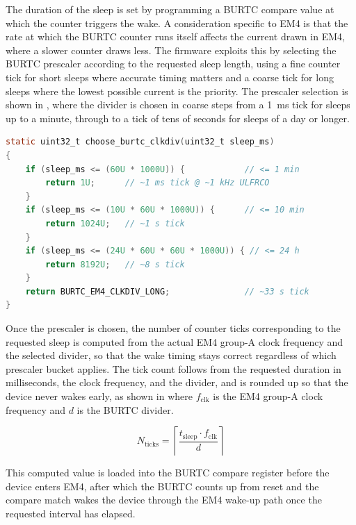 The duration of the sleep is set by programming a BURTC compare value at which the counter triggers the wake.
A consideration specific to EM4 is that the rate at which the BURTC counter runs itself affects the current drawn in EM4, where a slower counter draws less.
The firmware exploits this by selecting the BURTC prescaler according to the requested sleep length, using a fine counter tick for short sleeps where accurate timing matters and a coarse tick for long sleeps where the lowest possible current is the priority.
The prescaler selection is shown in , where the divider is chosen in coarse steps from a \SI{1}{\milli\second} tick for sleeps up to a minute, through to a tick of tens of seconds for sleeps of a day or longer.

\begin{lstlisting}[language=C, caption={BURTC prescaler selection in \texttt{em4.c}, trading wake-timing granularity for lower EM4 current on longer sleeps.}, label={lst:burtc_clkdiv}]
static uint32_t choose_burtc_clkdiv(uint32_t sleep_ms)
{
    if (sleep_ms <= (60U * 1000U)) {            // <= 1 min
        return 1U;      // ~1 ms tick @ ~1 kHz ULFRCO
    }
    if (sleep_ms <= (10U * 60U * 1000U)) {      // <= 10 min
        return 1024U;   // ~1 s tick
    }
    if (sleep_ms <= (24U * 60U * 60U * 1000U)) { // <= 24 h
        return 8192U;   // ~8 s tick
    }
    return BURTC_EM4_CLKDIV_LONG;               // ~33 s tick
}
\end{lstlisting}

Once the prescaler is chosen, the number of counter ticks corresponding to the requested sleep is computed from the actual EM4 group-A clock frequency and the selected divider, so that the wake timing stays correct regardless of which prescaler bucket applies.
The tick count follows from the requested duration in milliseconds, the clock frequency, and the divider, and is rounded up so that the device never wakes early, as shown in  where $f_{\mathrm{clk}}$ is the EM4 group-A clock frequency and $d$ is the BURTC divider.

\begin{equation}
\label{eq:burtc_ticks}
N_{\mathrm{ticks}} = \left\lceil \frac{t_{\mathrm{sleep}} \cdot f_{\mathrm{clk}}}{d} \right\rceil
\end{equation}

This computed value is loaded into the BURTC compare register before the device enters EM4, after which the BURTC counts up from reset and the compare match wakes the device through the EM4 wake-up path once the requested interval has elapsed.